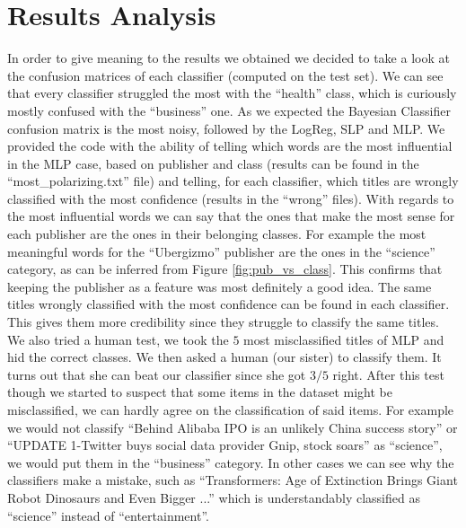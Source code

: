 \documentclass[10pt,a4paper]{report}
\begin{document}
\section{Results Analysis}
In order to give meaning to the results we obtained we decided to take a look at the confusion matrices of each classifier (computed on the test set). We can see that every classifier struggled the most with the \enquote{health} class, which is curiously mostly confused with the \enquote{business} one. As we expected the Bayesian Classifier confusion matrix is the most noisy, followed by the LogReg,  SLP and MLP. We provided the code with the ability of telling which words are the most influential in the MLP case, based on publisher and class (results can be found in the \enquote{most\_polarizing.txt} file) and telling, for each classifier, which titles are wrongly classified with the most confidence (results in the \enquote{wrong} files). With regards to the most influential words we can say that the ones that make the most sense for each publisher are the ones in their belonging classes. For example the most meaningful words for the \enquote{Ubergizmo} publisher are the ones in the \enquote{science} category, as can be inferred from Figure \ref{fig:pub_vs_class}. This confirms that keeping the publisher as a feature was most definitely a good idea. The same titles wrongly classified with the most confidence can be found in each classifier. This gives them more credibility since they struggle to classify the same titles. We also tried a human test, we took the $5$ most misclassified titles of MLP and hid the correct classes. We then asked a human (our sister) to classify them. It turns out that she can beat our classifier since she got $3/5$ right. After this test though we started to suspect that some items in the dataset might be misclassified, we can hardly agree on the classification of said items. For example we would not classify \enquote{Behind Alibaba IPO is an unlikely China success story} or \enquote{UPDATE 1-Twitter buys social data provider Gnip, stock soars} as \enquote{science}, we would put them in the \enquote{business} category. In other cases we can see why the classifiers make a mistake, such as \enquote{Transformers: Age of Extinction Brings Giant Robot Dinosaurs and Even Bigger  ...} which is understandably classified as \enquote{science} instead of \enquote{entertainment}.     
\end{document}
